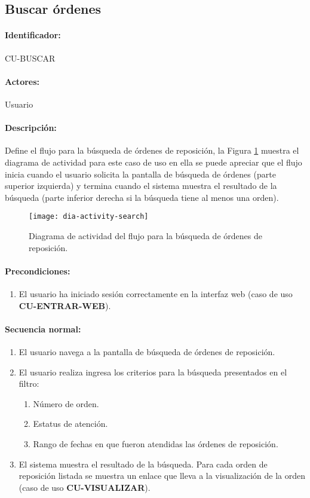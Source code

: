 \subsection{Buscar órdenes}\label{cu-buscar}
\paragraph{Identificador:}
CU-BUSCAR
\paragraph{Actores:}
Usuario
\paragraph{Descripción:}
Define el flujo para la búsqueda de órdenes de reposición, la Figura \ref{fig:dia-activity-search} muestra el diagrama de actividad para este caso de uso en ella se puede apreciar que el flujo inicia cuando el usuario solicita la pantalla de búsqueda de órdenes (parte superior izquierda) y termina cuando el sistema muestra el resultado de la búsqueda (parte inferior derecha si la búsqueda tiene al menos una orden).
\begin{figure}[h]
  \centering
  \texttt{[image: dia-activity-search]}
  \caption{Diagrama de actividad del flujo para la búsqueda de órdenes de reposición.}
  \label{fig:dia-activity-search}
\end{figure}
\paragraph{Precondiciones:}
\begin{enumerate}
  \item El usuario ha iniciado sesión correctamente en la interfaz web (caso de uso \textbf{CU-ENTRAR-WEB}).
\end{enumerate}
\paragraph{Secuencia normal:}
\begin{enumerate}
  \item El usuario navega a la pantalla de búsqueda de órdenes de reposición.
  \item El usuario realiza ingresa los criterios para la búsqueda presentados en el filtro:
  \begin{enumerate}
    \item Número de orden.
    \item Estatus de atención.
    \item Rango de fechas en que fueron atendidas las órdenes de reposición.
  \end{enumerate}
  \item El sistema muestra el resultado de la búsqueda. Para cada orden de reposición listada se muestra un enlace que lleva a la visualización de la orden (caso de uso \textbf{CU-VISUALIZAR}).
\end{enumerate}
